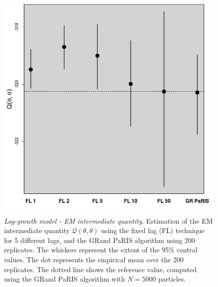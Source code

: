 \documentclass[12pt]{article}
\newcommand{\1}{\mathrm{1}}
\begin{document}
\begin{figure}[p]
\centering
\includegraphics[scale=0.5]{res_Estep_LG}
\caption{{\em Log-growth model - EM intermediate quantity}.
 Estimation of the EM intermediate quantity $\mathcal{Q}(\theta,\theta)$  using the fixed lag (FL) technique for 5 different lags, and the GRand PaRIS algorithm using 200 replicates.
  The whiskers represent the extent of the 95\% central values. The dot represents the empirical mean over the 200 replicates.
   The dotted line shows the reference value, computed using the GRand PaRIS algorithm with $N=5000$ particles.}
\label{fig:res:LG:EM}
\end{figure}
\end{document}

